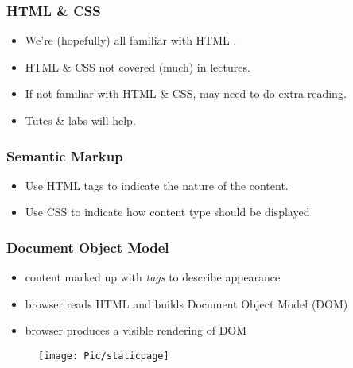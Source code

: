 \begin{frame}
\frametitle{HTML \& CSS}

\begin{itemize}
\item  We're (hopefully) all familiar with HTML .

\item  HTML \& CSS not covered (much) in lectures.

\item  If not familiar with HTML \& CSS, may need to do extra reading.

\item Tutes \& labs will help.
\end{itemize}
\end{frame}


\begin{frame}
\frametitle{Semantic Markup}

\begin{itemize}
\item  Use HTML tags to indicate the nature of the content. 

\item  Use CSS to indicate how content type should be displayed
\end{itemize}


\end{frame}

\begin{frame}
\frametitle{Document Object Model}
\begin{itemize}
\item  content marked up with {\em{tags}} to describe appearance
\item  browser reads HTML and builds Document Object Model (DOM)
\item  browser produces a visible rendering of DOM
\end{itemize}
    \begin{figure}
        \centering
        \texttt{[image: Pic/staticpage]}
    \end{figure}
\end{frame}

